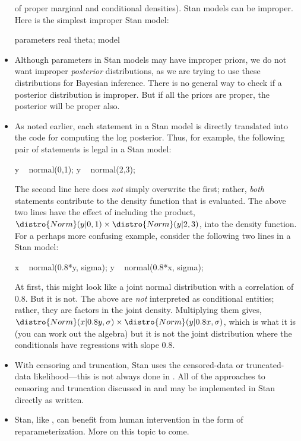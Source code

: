\begin{itemize}
  of proper marginal and conditional densities).  Stan models can be
  improper.  Here is the simplest improper Stan model: 
\begin{stancode}
parameters {
  real theta;
} 
model { }
\end{stancode}
\item Although parameters in Stan models may have improper priors, we
  do not want improper \emph{posterior} distributions, as we are trying to
  use these distributions for Bayesian inference.  There is no general
  way to check if a posterior distribution is improper.  But if all
  the priors are proper, the posterior will be proper also.
\item
  As noted earlier, each statement in a Stan model is directly translated into the \Cpp code for computing the log posterior.  Thus, for example, the following pair of statements is legal in a Stan model:
\begin{stancode}
y ~ normal(0,1);
y ~ normal(2,3);
\end{stancode}
%
The second line here does \emph{not} simply overwrite the first;
rather, \emph{both} statements contribute to the density function that
is evaluated.  The above two lines have the effect of including the
product, $\distro{Norm}(y|0,1) \times \distro{Norm}(y|2,3)$, into the
density function.
\\[6pt] 
For a perhaps more confusing example, consider the following two lines in a Stan model:
\begin{stancode}
x ~ normal(0.8*y, sigma);
y ~ normal(0.8*x, sigma);
\end{stancode}
%
At first, this might look like a joint normal distribution with a
correlation of 0.8.  But it is not.  The above are \emph{not}
interpreted as conditional entities; rather, they are factors in the
joint density.  Multiplying them gives, $\distro{Norm}(x|0.8y,\sigma)
\times \distro{Norm}(y|0.8x,\sigma)$, which is what it is (you can
work out the algebra) but it is not the joint distribution where the
conditionals have regressions with slope 0.8.
%
\item With censoring and truncation, Stan uses the censored-data or
  truncated-data likelihood---this is not always done in \BUGS.  All
  of the approaches to censoring and truncation discussed in
  \citep{GelmanEtAl:2013} and \citep{GelmanHill:2007} may
  be implemented in Stan directly as written.
%
\item Stan, like \BUGS, can benefit from human intervention in the
  form of reparameterization.  More on this topic to come.
\end{itemize}

